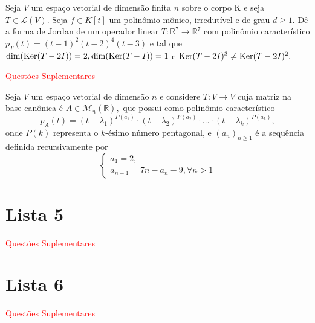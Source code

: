 \documentclass[11pt,a4paper]{article}
\begin{document}
\solucao{}
 Seja $V$ um espaço vetorial de dimensão finita $n$ sobre o corpo K e seja $T \in \mathcal{L}(V).$ Seja $f \in K[t]$ um polinômio mônico, irredutível e de grau $d \ge 1.$
\solucao{}
 Dê a forma de Jordan de um operador linear $T \colon \mathbb{R}^7 \to \mathbb{R}^7$ com polinômio característico $p_T(t) = (t - 1)^2(t - 2)^4(t - 3)$ e tal que $\dim(\operatorname{Ker}(T - 2I)) = 2, \dim(\operatorname{Ker}(T - I)) = 1$ e $\operatorname{Ker}(T - 2I)^3 \neq \operatorname{Ker}(T - 2I)^2.$
\solucao{}

\textcolor{Red}{Questões Suplementares}

 Seja $V$ um espaço vetorial de dimensão $n$ e considere $T \colon V \to V$ cuja matriz na base canônica é $A \in \mathcal{M}_n(\mathbb{R}),$ que possui como polinômio característico
\[
p_A(t) = (t - \lambda_1)^{P(a_1)} \cdot (t - \lambda_2)^{P(a_2)} \cdot \ldots \cdot (t - \lambda_k)^{P(a_k)},
\]
onde $P(k)$ representa o $k$-ésimo número pentagonal, e $(a_n)_{n \ge 1}$ é a sequência definida recursivamente por
\[\begin{cases}
a_1 = 2,\\
a_{n+1} = 7n - a_{n} - 9, \forall n > 1
\end{cases}\]
\solucao{}
\newpage
\section{\textcolor{Floresta}{Lista 5}}
\solucao{}


\textcolor{Red}{Questões Suplementares}

\solucao{}

\newpage
\section{\textcolor{Floresta}{Lista 6}}

   
   
   \textcolor{Red}{Questões Suplementares}

\solucao{}
\end{document}
